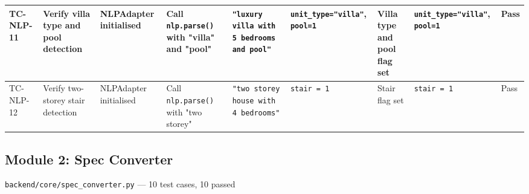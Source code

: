\begin{landscape}
\begin{longtable}{|p{1.4cm}|p{3.2cm}|p{3.0cm}|p{2.8cm}|p{2.8cm}|p{2.8cm}|p{2.6cm}|p{2.8cm}|p{1.0cm}|}
\rowcolor{passgreen}
TC-NLP-11 & Verify villa type and pool detection & NLPAdapter initialised & Call \texttt{nlp.parse()} with "villa" and "pool" & \texttt{"luxury villa with 5 bedrooms and pool"} & \texttt{unit\_type="villa"}, \texttt{pool=1} & Villa type and pool flag set & \texttt{unit\_type="villa"}, \texttt{pool=1} & Pass \\ \hline

\rowcolor{passgreen}
TC-NLP-12 & Verify two-storey stair detection & NLPAdapter initialised & Call \texttt{nlp.parse()} with "two storey" & \texttt{"two storey house with 4 bedrooms"} & \texttt{stair = 1} & Stair flag set & \texttt{stair = 1} & Pass \\ \hline

\end{longtable}
\end{landscape}

\subsection{Module 2: Spec Converter}
\texttt{backend/core/spec\_converter.py} — 10 test cases, 10 passed

